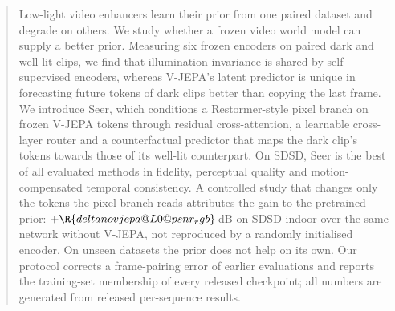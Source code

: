 \begin{abstract}
Low-light video enhancers learn their prior from one paired dataset and degrade on others. We study whether a frozen video world model can supply a better prior. Measuring six frozen encoders on paired dark and well-lit clips, we find that illumination invariance is shared by self-supervised encoders, whereas V-JEPA's latent predictor is unique in forecasting future tokens of dark clips better than copying the last frame. We introduce Seer, which conditions a Restormer-style pixel branch on frozen V-JEPA tokens through residual cross-attention, a learnable cross-layer router and a counterfactual predictor that maps the dark clip's tokens towards those of its well-lit counterpart. On SDSD, Seer is the best of all evaluated methods in fidelity, perceptual quality and motion-compensated temporal consistency. A controlled study that changes only the tokens the pixel branch reads attributes the gain to the pretrained prior: $+\R{deltanovjepa@L0@psnr_rgb}$\,dB on SDSD-indoor over the same network without V-JEPA, not reproduced by a randomly initialised encoder. On unseen datasets the prior does not help on its own. %
Our protocol corrects a frame-pairing error of earlier evaluations and reports the training-set membership of every released checkpoint; all numbers are generated from released per-sequence results.
\end{abstract}
